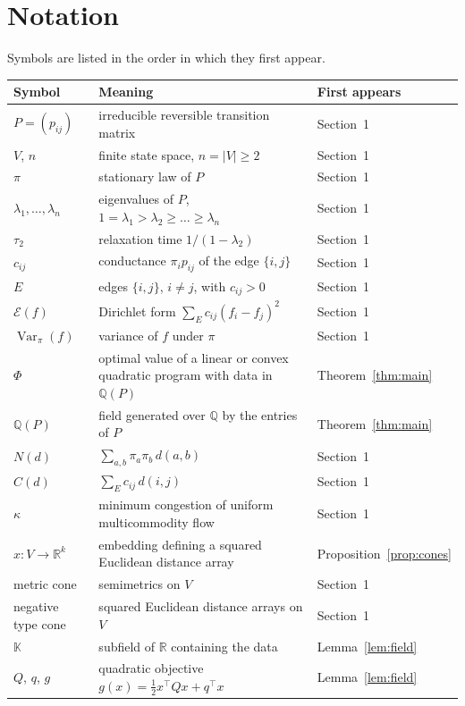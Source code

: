\documentclass[11pt]{amsart}
\theoremstyle{remark}
\numberwithin{equation}{section}
\newcommand{\Q}{\mathbb Q}
\newcommand{\R}{\mathbb R}
\newcommand{\K}{\mathbb K}
\begin{document}
\appendix
\section{Notation}\label{app:notation}
Symbols are listed in the order in which they first appear.

\begin{center}\small
\begin{tabular}{@{}lp{}l@{}}\toprule
Symbol & Meaning & First appears \\ \midrule
$P=(p_{ij})$ & irreducible reversible transition matrix & Section~1 \\
$V$, $n$ & finite state space, $n=|V|\ge2$ & Section~1 \\
$\pi$ & stationary law of $P$ & Section~1 \\
$\lambda_1,\dots,\lambda_n$ & eigenvalues of $P$, $1=\lambda_1>\lambda_2\ge\dots\ge\lambda_n$ & Section~1 \\
$\tau_2$ & relaxation time $1/(1-\lambda_2)$ & Section~1 \\
$c_{ij}$ & conductance $\pi_ip_{ij}$ of the edge $\{i,j\}$ & Section~1 \\
$E$ & edges $\{i,j\}$, $i\ne j$, with $c_{ij}>0$ & Section~1 \\
$\mathcal E(f)$ & Dirichlet form $\sum_E c_{ij}(f_i-f_j)^2$ & Section~1 \\
$\operatorname{Var}_\pi(f)$ & variance of $f$ under $\pi$ & Section~1 \\
$\Phi$ & optimal value of a linear or convex quadratic program with data in $\Q(P)$ & Theorem~\ref{thm:main} \\
$\Q(P)$ & field generated over $\Q$ by the entries of $P$ & Theorem~\ref{thm:main} \\
$N(d)$ & $\sum_{a,b}\pi_a\pi_b\,d(a,b)$ & Section~1 \\
$C(d)$ & $\sum_E c_{ij}\,d(i,j)$ & Section~1 \\
$\kappa$ & minimum congestion of uniform multicommodity flow & Section~1 \\
$x\colon V\to\R^k$ & embedding defining a squared Euclidean distance array & Proposition~\ref{prop:cones} \\
metric cone & semimetrics on $V$ & Section~1 \\
negative type cone & squared Euclidean distance arrays on $V$ & Section~1 \\
$\K$ & subfield of $\R$ containing the data & Lemma~\ref{lem:field} \\
$Q$, $q$, $g$ & quadratic objective $g(x)=\frac12x^\top Qx+q^\top x$ & Lemma~\ref{lem:field} \\

\end{tabular}
\end{center}
\end{document}
